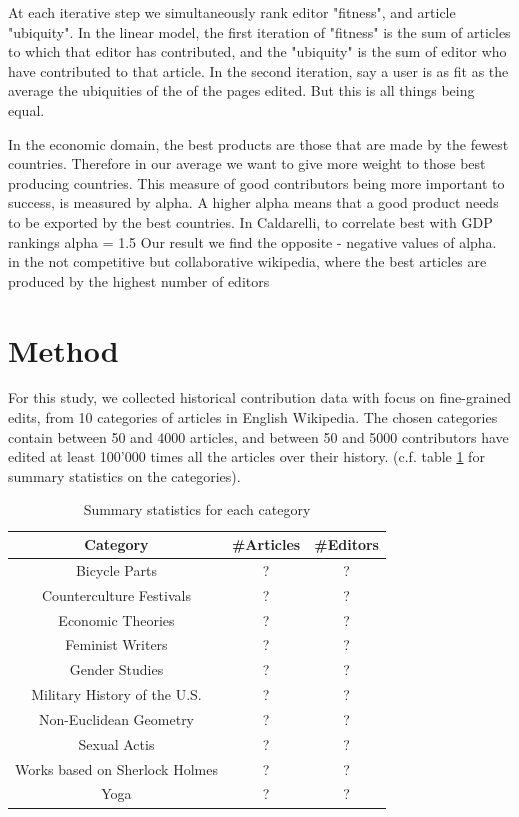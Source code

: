 \documentclass{acm_proc_article-sp}
\begin{document}
At each iterative step we simultaneously rank editor "fitness", and article "ubiquity". In the linear model, the first iteration of "fitness" is the sum of articles to which that editor has contributed, and the "ubiquity" is the sum of editor who have contributed to that article. In the second iteration, say a user is as fit as the average the ubiquities of the of the pages edited. But this is all things being equal.

In the economic domain, the best products are those that are made by the fewest countries. Therefore in our average we want to give more weight to those best producing countries. This measure of good contributors being more important to success, is measured by alpha. A higher alpha means that a good product needs to be exported by the best countries. In Caldarelli, to correlate best with GDP rankings alpha = 1.5 Our result we find the  opposite - negative values of alpha. in the not competitive but collaborative wikipedia, where the best articles are produced by the highest number of editors


\section{Method}
For this study, we collected historical contribution data with focus on fine-grained edits, from 10 categories of articles in English Wikipedia. The chosen categories contain between 50 and 4000 articles, and between 50 and 5000 contributors have edited at least 100'000 times all the articles over their history. (c.f. table \ref{tab:statistics} for summary statistics on the categories). 

\begin{table}
\centering
\caption{Summary statistics for each category}
\begin{tabular}{|c|c|c|} \hline
{\bf Category} & {\bf \#Articles} & {\bf \#Editors} \\ \hline
Bicycle Parts &   ? & ? \\ \hline
Counterculture Festivals &   ? & ? \\ \hline
Economic Theories &   ? & ? \\ \hline
Feminist Writers &   ? & ? \\ \hline
Gender Studies & ? & ?  \\ \hline
Military History of the U.S. & ? & ?  \\ \hline
Non-Euclidean Geometry & ? & ?  \\ \hline
Sexual Actis & ? & ?  \\ \hline
Works based on Sherlock Holmes & ? & ?  \\ \hline
Yoga & ? & ?  \\ \hline
\end{tabular}
\label{tab:statistics}
\end{table}
\end{document}
